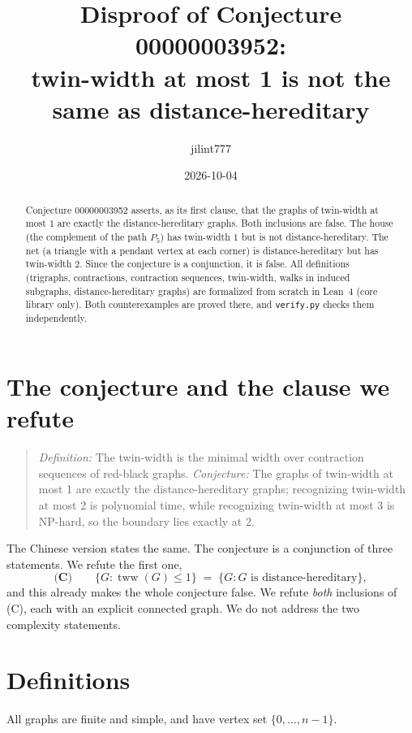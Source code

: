 \documentclass[11pt]{article}
\title{Disproof of Conjecture 00000003952:\\
twin-width at most 1 is not the same as distance-hereditary}
\author{jilint777}
\date{2026-10-04}
\theoremstyle{definition}
\theoremstyle{remark}
\begin{document}
\sloppy
\maketitle

\begin{abstract}
Conjecture 00000003952 asserts, as its first clause, that the graphs of twin-width at
most $1$ are exactly the distance-hereditary graphs. Both inclusions are false. The
house (the complement of the path $P_5$) has twin-width $1$ but is not
distance-hereditary. The net (a triangle with a pendant vertex at each corner) is
distance-hereditary but has twin-width $2$. Since the conjecture is a conjunction, it is
false. All definitions (trigraphs, contractions, contraction sequences, twin-width,
walks in induced subgraphs, distance-hereditary graphs) are formalized from scratch in
Lean~4 (core library only). Both counterexamples are proved there, and
\texttt{verify.py} checks them independently.
\end{abstract}

\section{The conjecture and the clause we refute}
\begin{quote}
\emph{Definition:} The twin-width is the minimal width over contraction sequences of
red-black graphs. \emph{Conjecture:} The graphs of twin-width at most 1 are exactly the
distance-hereditary graphs; recognizing twin-width at most 2 is polynomial time, while
recognizing twin-width at most 3 is NP-hard, so the boundary lies exactly at 2.
\end{quote}
The Chinese version states the same. The conjecture is a conjunction of three
statements. We refute the first one,
\[
  \textbf{(C)}\qquad \{G : \operatorname{tww}(G)\le 1\} \;=\; \{G : G \text{ is distance-hereditary}\},
\]
and this already makes the whole conjecture false. We refute \emph{both} inclusions of (C),
each with an explicit connected graph. We do not address the two complexity statements.

\section{Definitions}
All graphs are finite and simple, and have vertex set $\{0,\dots,n-1\}$.
\end{document}
